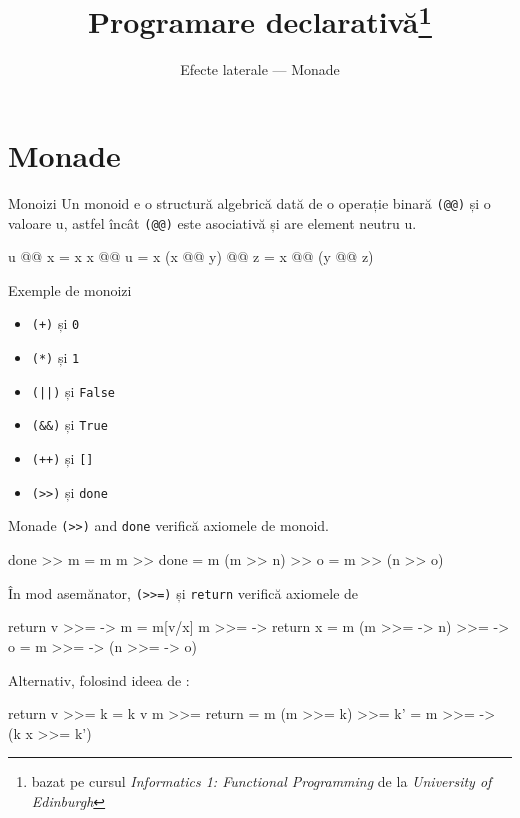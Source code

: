 \documentclass[xcolor=pdftex,romanian,colorlinks]{beamer}
\title[PD---Monade]{Programare declarativă\thanks{bazat pe cursul \emph{Informatics 1: Functional Programming} de la \emph{University of Edinburgh}}}
\subtitle{Efecte laterale --- Monade}
\begin{document}
\begin{frame}
  \titlepage
\end{frame}

\section{Monade}

\begin{frame}[fragile]{Monoizi}
Un monoid e o structură algebrică dată de o operație binară \lstinline$(@@)$ și o valoare u, astfel încât \lstinline$(@@)$ este asociativă și are element neutru u.

\begin{asciihs}
   u @@ x              =   x
   x @@ u              =   x
   (x @@ y) @@ z       =   x @@ (y @@ z)
\end{asciihs}
\begin{block}
{Exemple de monoizi}
\begin{itemize}
\item \lstinline$(+)$ și \lstinline$0$
\item \lstinline$(*)$ și \lstinline$1$
\item \lstinline$(||)$ și \lstinline$False$
\item \lstinline$(&&)$ și \lstinline$True$
\item \lstinline$(++)$ și \lstinline$[]$
\item \lstinline$(>>)$ și \lstinline$done$
\end{itemize}
\end{block}
\end{frame}


\begin{frame}[fragile]{Monade}
\lstinline$(>>)$ and \lstinline$done$ verifică axiomele de monoid.
\begin{asciihs}
   done >> m          =   m
   m >> done          =   m
   (m >> n) >> o      =   m >> (n >> o)
\end{asciihs}

\vfill
În mod asemănator, \lstinline$(>>=)$ și \lstinline$return$ verifică axiomele de 
\begin{asciihs}
  return v >>= \x -> m        =  m[v/x]
  m >>= \x -> return x        =  m
  (m >>= \x -> n) >>= \y-> o  =  m >>= \x -> (n >>= \y -> o)
\end{asciihs}

\vfill
Alternativ, folosind ideea de :
\begin{asciihs}
  return v >>= k    =  k v
  m >>= return      =  m
  (m >>= k) >>= k'  =  m >>= \x -> (k x >>= k')
\end{asciihs}
\end{frame}
\end{document}
